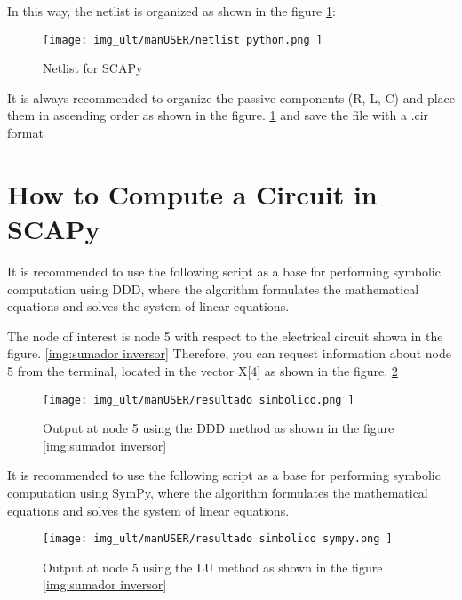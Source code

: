 In this way, the netlist is organized as shown in the figure \ref{img:netlist python}: 

\begin{figure}[H]
	\centering\texttt{[image: img\_ult/manUSER/netlist python.png
	]}
	\caption{Netlist for SCAPy}
	\label{img:netlist python}
\end{figure} 

It is always recommended to organize the passive components (R, L, C) and place them in ascending order as shown in the figure. \ref{img:netlist python} and save the file with a .cir format

\newpage

\section{How to Compute a Circuit in SCAPy}
It is recommended to use the following script as a base for performing symbolic computation using DDD, where the algorithm formulates the mathematical equations and solves the system of linear equations.



The node of interest is node 5 with respect to the electrical circuit shown in the figure. \ref{img:sumador inversor} Therefore, you can request information about node 5 from the terminal, located in the vector X[4] as shown in the figure. \ref{img:output analisis simbolico}

\begin{figure}[H]
	\centering\texttt{[image: img\_ult/manUSER/resultado simbolico.png
	]}
	\caption{Output at node 5 using the DDD method as shown in the figure \ref{img:sumador inversor}}
	\label{img:output analisis simbolico}
\end{figure} 


It is recommended to use the following script as a base for performing symbolic computation using SymPy, where the algorithm formulates the mathematical equations and solves the system of linear equations.



\begin{figure}[H]
	\centering\texttt{[image: img\_ult/manUSER/resultado simbolico sympy.png
	]}
	\caption{Output at node 5 using the LU method as shown in the figure \ref{img:sumador inversor}}
	\label{img:output analisis simbolico 2}
\end{figure} 

